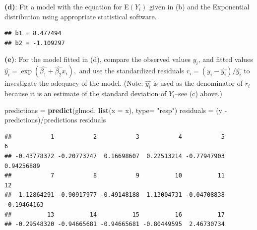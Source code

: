 \documentclass[]{article}
\newenvironment{Shaded}{\begin{snugshade}}{\end{snugshade}}
\newcommand{\KeywordTok}[1]{\textcolor[rgb]{0.13,0.29,0.53}{\textbf{{#1}}}}
\newcommand{\DataTypeTok}[1]{\textcolor[rgb]{0.13,0.29,0.53}{{#1}}}
\newcommand{\DecValTok}[1]{\textcolor[rgb]{0.00,0.00,0.81}{{#1}}}
\newcommand{\CharTok}[1]{\textcolor[rgb]{0.31,0.60,0.02}{{#1}}}
\newcommand{\StringTok}[1]{\textcolor[rgb]{0.31,0.60,0.02}{{#1}}}
\newcommand{\NormalTok}[1]{{#1}}
\begin{document}
\textbf{(d)}: Fit a model with the equation for E\((Y_i)\) given in (b)
and the Exponential distribution using appropriate statistical software.

\begin{Shaded}
\end{Shaded}

\begin{verbatim}
## b1 = 8.477494 
## b2 = -1.109297
\end{verbatim}

\textbf{(e)}: For the model fitted in (d), compare the observed values
\(y_i\), and fitted values
\(\hat{y_i} = \exp(\hat{\beta_1} + \hat{\beta_2}x_i),\) and use the
standardized residuals \(r_i = (y_i - \hat{y_i})/\hat{y_i}\) to
investigate the adequacy of the model. (Note: \(\hat{y_i}\) is used as
the denominator of \(r_i\) because it is an estimate of the standard
deviation of \(Y_i\)--see (c) above.)

\begin{Shaded}
\begin{Highlighting}[]
\NormalTok{predictions =}\StringTok{ }\KeywordTok{predict}\NormalTok{(glmod, }\KeywordTok{list}\NormalTok{(}\DataTypeTok{x =} \NormalTok{x), }\DataTypeTok{type=} \StringTok{"resp"}\NormalTok{)}
\NormalTok{residuals =}\StringTok{ }\NormalTok{(y -}\StringTok{ }\NormalTok{predictions)/predictions}
\NormalTok{residuals}
\end{Highlighting}
\end{Shaded}

\begin{verbatim}
##           1           2           3           4           5           6 
## -0.43778372 -0.20773747  0.16698607  0.22513214 -0.77947903  0.94256889 
##           7           8           9          10          11          12 
##  1.12864291 -0.90917977 -0.49148188  1.13004731 -0.04708838 -0.19464163 
##          13          14          15          16          17 
## -0.29548320 -0.94665681 -0.94665681 -0.80449595  2.46730734
\end{verbatim}
\end{document}
